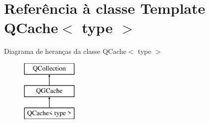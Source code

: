 \hypertarget{class_q_cache}{\section{Referência à classe Template Q\-Cache$<$ type $>$}
\label{class_q_cache}
}
Diagrama de heranças da classe Q\-Cache$<$ type $>$\begin{figure}[H]
\begin{center}
\leavevmode
\includegraphics[height=3.000000cm]{class_q_cache}
\end{center}
\end{figure}
